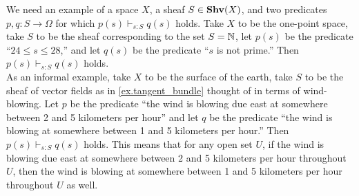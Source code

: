 \documentclass[7Sketches]{subfiles}
\begin{document}

{
We need an example of a space $X$, a sheaf $S\in\mathbf{Shv}(X)$, and two predicates $p,q\colon S\to\Omega$ for which $p(s)\vdash_{s:S} q(s)$ holds. Take $X$ to be the one-point space, take $S$ to be the sheaf corresponding to the set $S=\mathbb{N}$, let $p(s)$ be the predicate ``$24\leq s\leq 28$,'' and let $q(s)$ be the predicate ``$s$ is not prime.'' Then $p(s)\vdash_{s:S} q(s)$ holds.\\

As an informal example, take $X$ to be the surface of the earth, take $S$ to be the sheaf of vector fields as in \cref{ex.tangent_bundle} thought of in terms of wind-blowing. Let $p$ be the predicate ``the wind is blowing due east at somewhere between 2 and 5 kilometers per hour'' and let $q$ be the predicate ``the wind is blowing at somewhere between 1 and 5 kilometers per hour.'' Then $p(s)\vdash_{s:S} q(s)$ holds. This means that for any open set $U$, if the wind is blowing due east at somewhere between 2 and 5 kilometers per hour throughout $U$, then the wind is blowing at somewhere between 1 and 5 kilometers per hour throughout $U$ as well.
}
\end{document}
